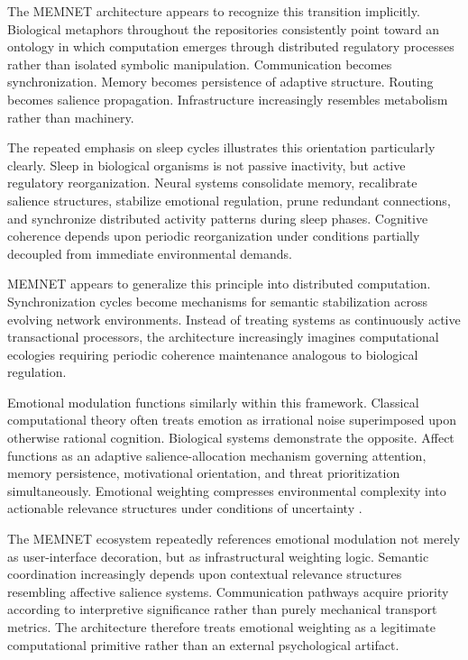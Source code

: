 \documentclass[11pt,a4paper]{article}
\begin{document}
The MEMNET architecture appears to recognize this transition implicitly. Biological metaphors throughout the repositories consistently point toward an ontology in which computation emerges through distributed regulatory processes rather than isolated symbolic manipulation. Communication becomes synchronization. Memory becomes persistence of adaptive structure. Routing becomes salience propagation. Infrastructure increasingly resembles metabolism rather than machinery.

The repeated emphasis on sleep cycles illustrates this orientation particularly clearly. Sleep in biological organisms is not passive inactivity, but active regulatory reorganization. Neural systems consolidate memory, recalibrate salience structures, stabilize emotional regulation, prune redundant connections, and synchronize distributed activity patterns during sleep phases. Cognitive coherence depends upon periodic reorganization under conditions partially decoupled from immediate environmental demands.

MEMNET appears to generalize this principle into distributed computation. Synchronization cycles become mechanisms for semantic stabilization across evolving network environments. Instead of treating systems as continuously active transactional processors, the architecture increasingly imagines computational ecologies requiring periodic coherence maintenance analogous to biological regulation.

Emotional modulation functions similarly within this framework. Classical computational theory often treats emotion as irrational noise superimposed upon otherwise rational cognition. Biological systems demonstrate the opposite. Affect functions as an adaptive salience-allocation mechanism governing attention, memory persistence, motivational orientation, and threat prioritization simultaneously. Emotional weighting compresses environmental complexity into actionable relevance structures under conditions of uncertainty \cite{friston2010}.

The MEMNET ecosystem repeatedly references emotional modulation not merely as user-interface decoration, but as infrastructural weighting logic. Semantic coordination increasingly depends upon contextual relevance structures resembling affective salience systems. Communication pathways acquire priority according to interpretive significance rather than purely mechanical transport metrics. The architecture therefore treats emotional weighting as a legitimate computational primitive rather than an external psychological artifact.
\end{document}
